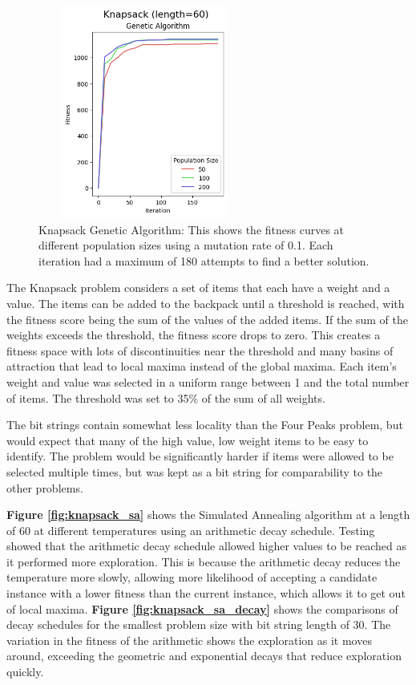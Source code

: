 \documentclass[letterpaper]{article} %
\begin{document}
\begin{figure}[!htb]
\centering
\includegraphics[width=2.75in, height=2.75in]{figures/Knapsack_length=60_Genetic_Algorithm_l_60_ma_60_p_50__100__200_mu_0.1_.png}
\caption{Knapsack Genetic Algorithm: This shows the fitness curves at different population sizes using a mutation rate of 0.1. Each iteration had a maximum of 180 attempts to find a better solution. }
\label{fig:knapsack_ga}
\end{figure}

The Knapsack problem considers a set of items that each have a weight and a value.  The items can be added to the backpack until a threshold is reached, with the fitness score being the sum of the values of the added items.  If the sum of the weights exceeds the threshold, the fitness score drops to zero.  This creates a fitness space with lots of discontinuities near the threshold and many basins of attraction that lead to local maxima instead of the global maxima.   Each item's weight and value was selected in a uniform range between 1 and the total number of items.  The threshold was set to 35\% of the sum of all weights.

The bit strings contain somewhat less locality than the Four Peaks problem, but would expect that many of the high value, low weight items to be easy to identify.  The problem would be significantly harder if items were allowed to be selected multiple times, but was kept as a bit string for comparability to the other problems.



\textbf{Figure \ref{fig:knapsack_sa}} shows the Simulated Annealing algorithm at a length of 60 at different temperatures using an arithmetic decay schedule.  Testing showed that the arithmetic decay schedule allowed higher values to be reached as it performed more exploration.  This is because the arithmetic decay reduces the temperature more slowly, allowing more likelihood of accepting a candidate instance with a lower fitness than the current instance, which allows it to get out of local maxima.  \textbf{Figure \ref{fig:knapsack_sa_decay}} shows the comparisons of decay schedules for the smallest problem size with bit string length of 30.  The variation in the fitness of the arithmetic shows the exploration as it moves around, exceeding the geometric and exponential decays that reduce exploration quickly.
\end{document}
